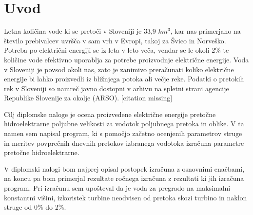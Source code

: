 
\chapter{Uvod}\label{sec: Uvod}
\thispagestyle{fancy}



Letna količina vode ki se pretoči v Sloveniji je 33,9 $km^{3}$, kar nas primerjano na število prebivalcev uvršča v sam vrh v Evropi, takoj za Švico in Norveško. Potreba po električni energiji se iz leta v leto veča, vendar se le okoli 2\% te količine vode efektivno uporablja za potrebe proizvodnje električne energije. Voda v Sloveniji je povsod okoli nas, zato je zanimivo preračunati koliko električne energije bi lahko proizvedli iz bližnjega potoka ali večje reke. Podatki o pretokih rek v Sloveniji so namreč javno dostopni v arhivu na spletni strani agencije Republike Slovenije za okolje (ARSO). [citation missing]


Cilj diplomske naloge je ocena proizvedene električne energije pretočne hidroelektrarne poljubne velikosti za vodotok poljubnega pretoka in oblike. V ta namen sem napisal program, ki s pomočjo začetno ocenjenih parametrov struge in meritev povprečnih dnevnih pretokov izbranega vodotoka izračuna parametre pretočne hidroelektrarne. 


V diplomski nalogi bom najprej opisal postopek izračuna z osnovnimi enačbami, na koncu pa bom primerjal rezultate ročnega izračuna z rezultati ki jih izračuna program. Pri izračunu sem upošteval da je voda za pregrado na maksimalni konstantni višini, izkoristek turbine neodvisen od pretoka skozi turbino in naklon struge od 0\% do 2\%.



